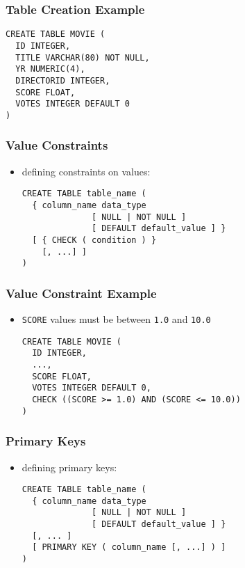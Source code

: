 \documentclass[dvipsnames]{beamer}
\theoremstyle{plain}
\begin{document}
\begin{frame}[fragile]
  \frametitle{Table Creation Example}

  \begin{lstlisting}
CREATE TABLE MOVIE (
  ID INTEGER,
  TITLE VARCHAR(80) NOT NULL,
  YR NUMERIC(4),
  DIRECTORID INTEGER,
  SCORE FLOAT,
  VOTES INTEGER DEFAULT 0
)
  \end{lstlisting}
\end{frame}

\begin{frame}[fragile]
  \frametitle{Value Constraints}

  \begin{itemize}
    \item defining constraints on values:
    \begin{lstlisting}
CREATE TABLE table_name (
  { column_name data_type
              [ NULL | NOT NULL ]
              [ DEFAULT default_value ] }
  [ { CHECK ( condition ) }
    [, ...] ]
)
    \end{lstlisting}
  \end{itemize}
\end{frame}

\begin{frame}[fragile]
  \frametitle{Value Constraint Example}

  \begin{itemize}
    \item \texttt{SCORE} values must be between \texttt{1.0} and \texttt{10.0}
    \begin{lstlisting}
CREATE TABLE MOVIE (
  ID INTEGER,
  ...,
  SCORE FLOAT,
  VOTES INTEGER DEFAULT 0,
  CHECK ((SCORE >= 1.0) AND (SCORE <= 10.0))
)
    \end{lstlisting}
  \end{itemize}
\end{frame}

\begin{frame}[fragile]
  \frametitle{Primary Keys}

  \begin{itemize}
    \item defining primary keys:
    \begin{lstlisting}
CREATE TABLE table_name (
  { column_name data_type
              [ NULL | NOT NULL ]
              [ DEFAULT default_value ] }
  [, ... ]
  [ PRIMARY KEY ( column_name [, ...] ) ]
)
    \end{lstlisting}
  \end{itemize}
\end{frame}
\end{document}
